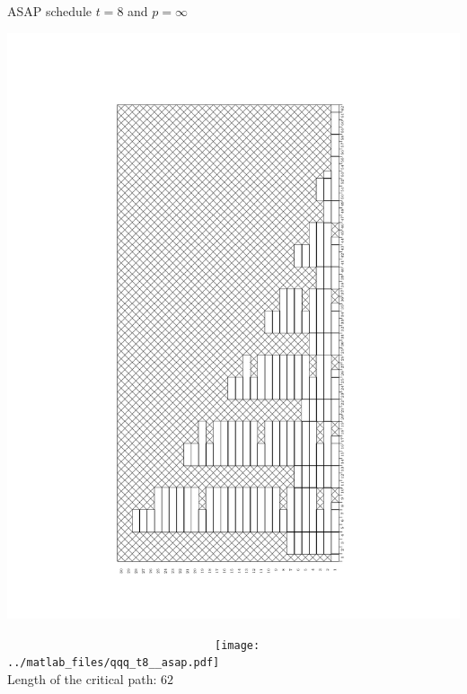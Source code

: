 \begin{frame}
ASAP schedule $t=8$ and $p=\infty$\\

  {\begin{minipage}{.25\textwidth}\vspace*{-2.8cm}
  \includegraphics[width=\textwidth,angle=270]{./fig/t8_p30_fwd.pdf}\end{minipage}}
  ~~~~~~~~~~~~~~~~~~~~~~~~~~~~~~~~~\texttt{[image: ../matlab\_files/qqq\_t8\_\_asap.pdf]}\\

Length of the critical path: $62$

\end{frame}




